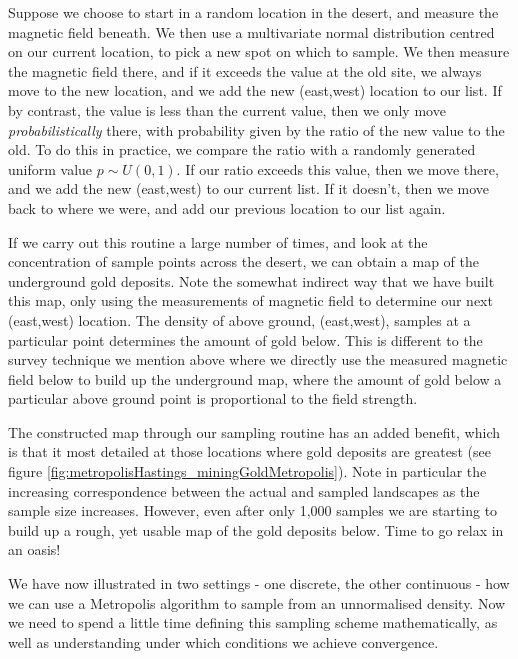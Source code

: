 \documentclass[11pt,fullpage]{book}
\begin{document}
Suppose we choose to start in a random location in the desert, and measure the magnetic field beneath. We then use a multivariate normal distribution centred on our current location, to pick a new spot on which to sample. We then measure the magnetic field there, and if it exceeds the value at the old site, we always move to the new location, and we add the new (east,west) location to our list. If by contrast, the value is less than the current value, then we only move \textit{probabilistically} there, with probability given by the ratio of the new value to the old. To do this in practice, we compare the ratio with a randomly generated uniform value $p\sim U(0,1)$. If our ratio exceeds this value, then we move there, and we add the new (east,west) to our current list. If it doesn't, then we move back to where we were, and add our previous location to our list again.

If we carry out this routine a large number of times, and look at the concentration of sample points across the desert, we can obtain a map of the underground gold deposits. Note the somewhat indirect way that we have built this map, only using the measurements of magnetic field to determine our next (east,west) location. The density of above ground, (east,west), samples at a particular point determines the amount of gold below. This is different to the survey technique we mention above where we directly use the measured magnetic field below to build up the underground map, where the amount of gold below a particular above ground point is proportional to the field strength. 

The constructed map through our sampling routine has an added benefit, which is that it most detailed at those locations where gold deposits are greatest (see figure \ref{fig:metropolisHastings_miningGoldMetropolis}). Note in particular the increasing correspondence between the actual and sampled landscapes as the sample size increases. However, even after only 1,000 samples we are starting to build up a rough, yet usable map of the gold deposits below. Time to go relax in an oasis!

We have now illustrated in two settings - one discrete, the other continuous - how we can use a Metropolis algorithm to sample from an unnormalised density. Now we need to spend a little time defining this sampling scheme mathematically, as well as understanding under which conditions we achieve convergence. 
\end{document}
